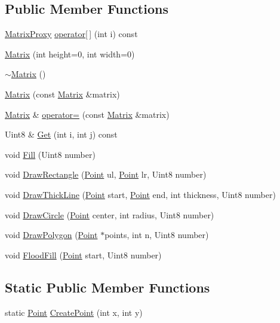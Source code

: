 \subsection*{Public Member Functions}
\begin{DoxyCompactItemize}
\item 
\hyperlink{classMatrix_1_1MatrixProxy}{MatrixProxy} \hyperlink{classMatrix_ab54bf109f85ced0472a7e0c03d16471c}{operator\mbox{[}$\,$\mbox{]}} (int i) const 
\item 
\hyperlink{classMatrix_a1cf5bd8134711df6f63e1dbef1912b86}{Matrix} (int height=0, int width=0)
\item 
\hyperlink{classMatrix_a9b1c3627f573d78a2f08623fdfef990f}{$\sim$Matrix} ()
\item 
\hyperlink{classMatrix_a2b1fedfb1b076d4ae504d2c61019871f}{Matrix} (const \hyperlink{classMatrix}{Matrix} \&matrix)
\item 
\hyperlink{classMatrix}{Matrix} \& \hyperlink{classMatrix_a45e4814b752129bed1f1316632f8543a}{operator=} (const \hyperlink{classMatrix}{Matrix} \&matrix)
\item 
Uint8 \& \hyperlink{classMatrix_a06fc8df480cd88daf69eaa05867cb7bd}{Get} (int i, int j) const 
\item 
void \hyperlink{classMatrix_a4a7c3875be94e94786db920c441973e6}{Fill} (Uint8 number)
\item 
void \hyperlink{classMatrix_a55977ba3ee91f352759f446a5092ea23}{DrawRectangle} (\hyperlink{structMatrix_1_1Point}{Point} ul, \hyperlink{structMatrix_1_1Point}{Point} lr, Uint8 number)
\item 
void \hyperlink{classMatrix_a8aecf2d42e65b27f051c8af79aeeb467}{DrawThickLine} (\hyperlink{structMatrix_1_1Point}{Point} start, \hyperlink{structMatrix_1_1Point}{Point} end, int thickness, Uint8 number)
\item 
void \hyperlink{classMatrix_a9dd7af97fcc825ca07a64b28050cb44f}{DrawCircle} (\hyperlink{structMatrix_1_1Point}{Point} center, int radius, Uint8 number)
\item 
void \hyperlink{classMatrix_a3b2f9c59a4cc8da933de12f4ccb867f6}{DrawPolygon} (\hyperlink{structMatrix_1_1Point}{Point} $\ast$points, int n, Uint8 number)
\item 
void \hyperlink{classMatrix_a7209ed0123ff3686f0d0f7f4e6ac7094}{FloodFill} (\hyperlink{structMatrix_1_1Point}{Point} start, Uint8 number)
\end{DoxyCompactItemize}
\subsection*{Static Public Member Functions}
\begin{DoxyCompactItemize}
\item 
static \hyperlink{structMatrix_1_1Point}{Point} \hyperlink{classMatrix_a39929c70aea7926beaf183b374239558}{CreatePoint} (int x, int y)
\end{DoxyCompactItemize}
